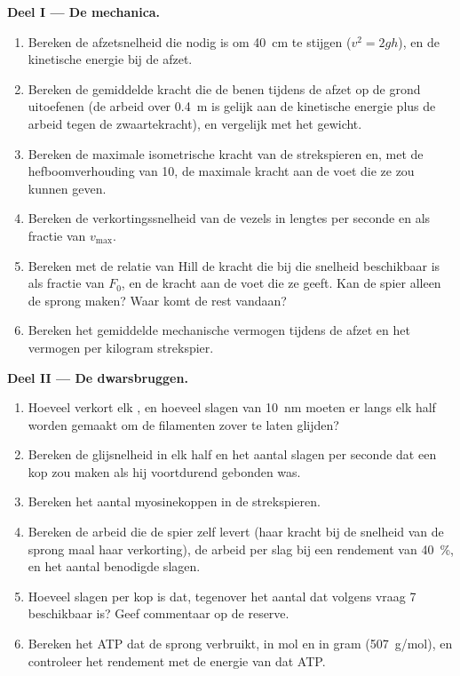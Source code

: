 \begin{problem}
\medskip
\noindent\textbf{Deel I --- De mechanica.}
\begin{enumerate}
  \item Bereken de afzetsnelheid die nodig is om \qty{40}{cm} te stijgen
        ($v^{2} = 2gh$), en de kinetische energie bij de afzet.
  \item Bereken de gemiddelde kracht die de benen tijdens de afzet op de
        grond uitoefenen (de arbeid over \qty{0.4}{m} is gelijk aan de
        kinetische energie plus de arbeid tegen de zwaartekracht), en
        vergelijk met het gewicht.
  \item Bereken de maximale isometrische kracht van de strekspieren en, met
        de hefboomverhouding van 10, de maximale kracht aan de voet die ze
        zou kunnen geven.
  \item Bereken de verkortingssnelheid van de vezels in lengtes per seconde
        en als fractie van $v_{\max}$.
  \item Bereken met de relatie van Hill de kracht die bij die snelheid
        beschikbaar is als fractie van $F_0$, en de kracht aan de voet die
        ze geeft. Kan de spier alleen de sprong maken? Waar komt de rest
        vandaan?
  \item Bereken het gemiddelde mechanische vermogen tijdens de afzet en het
        vermogen per kilogram strekspier.
\end{enumerate}

\medskip
\noindent\textbf{Deel II --- De dwarsbruggen.}
\begin{enumerate}[resume]
  \item Hoeveel verkort elk , en hoeveel slagen van
        \qty{10}{nm} moeten er langs elk half  worden gemaakt om de
        filamenten zover te laten glijden?
  \item Bereken de glijsnelheid in elk half  en het aantal slagen per
        seconde dat een kop zou maken als hij voortdurend gebonden was.
  \item Bereken het aantal myosinekoppen in de strekspieren.
  \item Bereken de arbeid die de spier zelf levert (haar kracht bij de
        snelheid van de sprong maal haar verkorting), de arbeid per slag bij
        een rendement van \qty{40}{\%}, en het aantal benodigde slagen.
  \item Hoeveel slagen per kop is dat, tegenover het aantal dat volgens
        vraag 7 beschikbaar is? Geef commentaar op de reserve.
  \item Bereken het ATP dat de sprong verbruikt, in mol en in gram
        (\qty{507}{g/mol}), en controleer het rendement met de energie van
        dat ATP.
\end{enumerate}


\end{problem}
